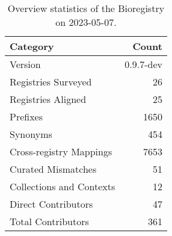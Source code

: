 \begin{table}
\caption{Overview statistics of the Bioregistry on 2023-05-07.}
\label{tab:bioregistry-summary}
\begin{tabular}{lr}
\toprule
Category & Count \\
\midrule
Version & 0.9.7-dev \\
Registries Surveyed & 26 \\
Registries Aligned & 25 \\
Prefixes & 1650 \\
Synonyms & 454 \\
Cross-registry Mappings & 7653 \\
Curated Mismatches & 51 \\
Collections and Contexts & 12 \\
Direct Contributors & 47 \\
Total Contributors & 361 \\
\bottomrule
\end{tabular}
\end{table}
